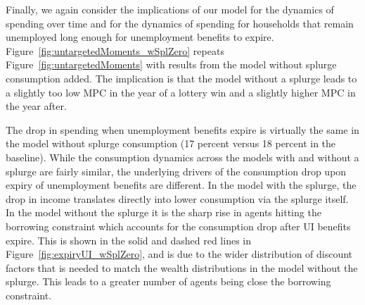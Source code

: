 \documentclass[\econtexRoot/HAFiscal]{subfiles}
\begin{document}

Finally, we again consider the  implications of our model for the dynamics of spending over time and for the dynamics of spending for households that remain unemployed long enough for unemployment benefits to expire.
Figure~\ref{fig:untargetedMoments_wSplZero} repeats Figure~\ref{fig:untargetedMoments} with results from the model without splurge consumption added.
The implication is that the model without a splurge leads to a slightly too low MPC in the year of a lottery win and a slightly higher MPC in the year after.


The drop in spending when unemployment benefits expire is virtually the same in the model without splurge consumption (17 percent versus 18 percent in the baseline).
While the consumption dynamics across the models with and without a splurge are fairly similar, the underlying drivers of the consumption drop upon expiry of unemployment benefits are different.
In the model with the splurge, the drop in income translates directly into lower consumption via the splurge itself.
In the model without the splurge it is the sharp rise in agents hitting the borrowing constraint which accounts for the consumption drop after UI benefits expire.
This is shown in the solid and dashed red lines in Figure~\ref{fig:expiryUI_wSplZero}, and is due to the wider distribution of discount factors that is needed to match the wealth distributions in the model without the splurge.
This leads to a greater number of agents being close the borrowing constraint.
\end{document}
